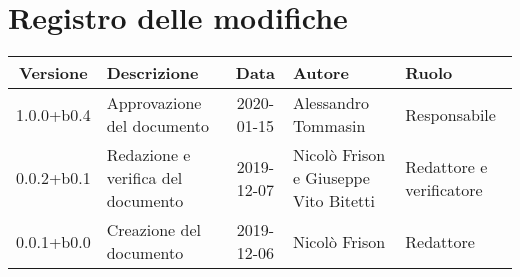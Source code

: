 \section*{Registro delle modifiche}

\begin{center}
	\begin{longtable}{|c|p{3.5cm}|c|p{3cm}|p{3cm}|}
		\hline
		\rowcolor{lighter-grayer}
		\textbf{Versione} & \textbf{Descrizione} & \textbf{Data} & \textbf{Autore} & \textbf{Ruolo} \\
		\hline
		\endfirsthead


	1.0.0+b0.4 & Approvazione del documento & 2020-01-15 & Alessandro Tommasin & Responsabile \\
	\hline
	0.0.2+b0.1 & Redazione e verifica del documento & 2019-12-07 & Nicolò Frison e Giuseppe Vito Bitetti & Redattore e verificatore \\
	\hline
	0.0.1+b0.0 & Creazione del documento & 2019-12-06 & Nicolò Frison & Redattore \\

	\hline

	\end{longtable}
\end{center}
